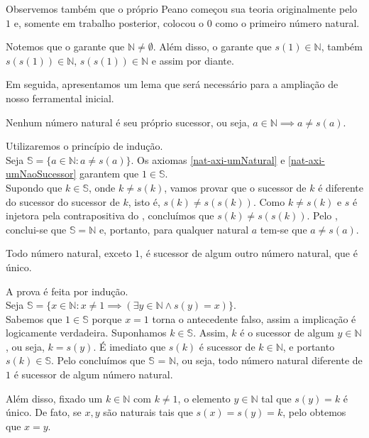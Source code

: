 \documentclass[../main.tex]{subfiles}
\begin{document}

Observemos também que o próprio Peano começou sua teoria originalmente pelo $1$ e, somente em trabalho posterior, colocou o $0$ como o primeiro número natural.

Notemos que o  garante que $\mathbb{N} \neq \emptyset $. Além disso, o  garante que $s(1) \in \mathbb{N}$, também $s(s(1)) \in \mathbb{N}$, $s(s(1)) \in \mathbb{N}$ e assim por diante.

Em seguida, apresentamos um lema que será necessário para a ampliação de nosso ferramental inicial.
\begin{lema}\label{nat-lema-nenhumNumeroProprioSucessor}
    Nenhum número natural é seu próprio sucessor, ou seja, $a \in \mathbb{N} \implies a \neq s(a) $.
\end{lema}
\begin{dem}
    Utilizaremos o princípio de indução.\\
    Seja $\mathbb{S} = \{a \in \mathbb{N} : a \neq s(a) \}$.
    Os axiomas \ref{nat-axi-umNatural} e \ref{nat-axi-umNaoSucessor} garantem que $1 \in \mathbb{S}$.\\
    Supondo que $ k \in \mathbb{S}$, onde $ k \neq s(k)$, vamos provar que o sucessor de $k$ é diferente do sucessor do sucessor de $k$, isto é, $s(k) \neq s(s(k))$. Como $k \neq s(k)$ e $s$ é injetora pela contrapositiva do , concluímos que $s(k) \neq s(s(k))$. Pelo , conclui-se que $\mathbb{S} = \mathbb{N}$ e, portanto, para qualquer natural $a$ tem-se que $a \neq s(a)$.
\end{dem}
\begin{teo}\label{nat-teo-todoNaturalESucessor}
    Todo número natural, exceto $1$, é sucessor de algum outro número natural, que é único.
\end{teo}
\begin{dem}
    A prova é feita por indução.  \\ 
    Seja $\mathbb{S} = \{x \in \mathbb{N} : x \neq 1 \implies (\exists y \in \mathbb{N} \land s(y) = x) \}$.\\
    Sabemos que $1 \in \mathbb{S}$ porque $x = 1$ torna o antecedente falso, assim a implicação é logicamente verdadeira. Suponhamos $k \in \mathbb{S}$. Assim, $k$ é o sucessor de algum $y \in \mathbb{N}$, ou seja, $k = s(y)$. É imediato que $s(k)$ é sucessor de $k \in \mathbb{N}$, e portanto $s(k) \in \mathbb{S}$. Pelo  concluímos que $\mathbb{S}$ = $\mathbb{N}$, ou seja, todo número natural diferente de $1$ é sucessor de algum número natural.

    Além disso, fixado um $k \in \mathbb{N}$ com $k \neq 1$, o elemento $y \in \mathbb{N}$ tal que $s(y) = k$ é único. De fato, se $x,y$ são naturais tais que $s(x) = s(y) = k$, pelo  obtemos que $x = y$.
\end{dem}
\end{document}
